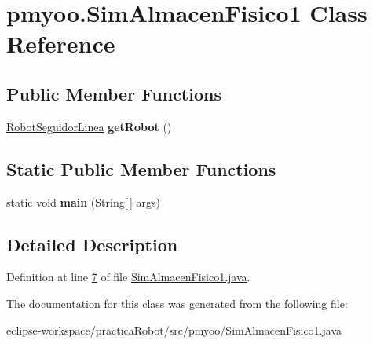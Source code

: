 \hypertarget{classpmyoo_1_1_sim_almacen_fisico1}{}\section{pmyoo.\+Sim\+Almacen\+Fisico1 Class Reference}
\label{classpmyoo_1_1_sim_almacen_fisico1}
\subsection*{Public Member Functions}
\begin{DoxyCompactItemize}
\item 
\mbox{\label{classpmyoo_1_1_sim_almacen_fisico1_ade4a4a864abb864d6f6ecb10ddc14051}} 
\mbox{\hyperlink{classpmyoo_1_1_robot_seguidor_linea}{Robot\+Seguidor\+Linea}} {\bfseries get\+Robot} ()
\end{DoxyCompactItemize}
\subsection*{Static Public Member Functions}
\begin{DoxyCompactItemize}
\item 
\mbox{\label{classpmyoo_1_1_sim_almacen_fisico1_a588d445c8306fe0a7efc289b4cf7d37f}} 
static void {\bfseries main} (String\mbox{[}$\,$\mbox{]} args)
\end{DoxyCompactItemize}


\subsection{Detailed Description}


Definition at line \mbox{\hyperlink{_sim_almacen_fisico1_8java_source_l00007}{7}} of file \mbox{\hyperlink{_sim_almacen_fisico1_8java_source}{Sim\+Almacen\+Fisico1.\+java}}.



The documentation for this class was generated from the following file\+:\begin{DoxyCompactItemize}
\item 
eclipse-\/workspace/practica\+Robot/src/pmyoo/Sim\+Almacen\+Fisico1.\+java\end{DoxyCompactItemize}
